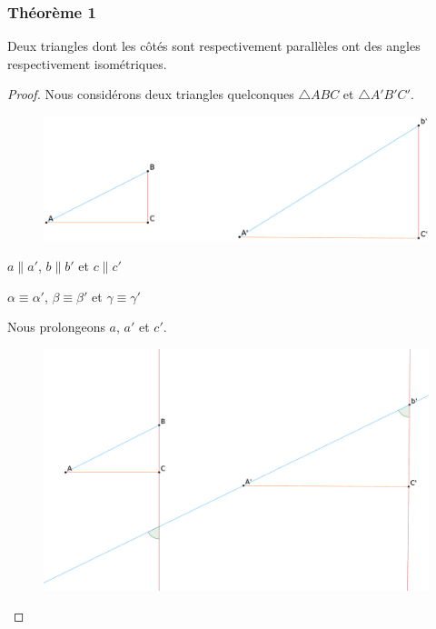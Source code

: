 \documentclass[a4paper,12pt]{article}
\begin{document}
\subsubsection{Théorème 1}
\begin{theorem}
Deux triangles dont les côtés sont respectivement parallèles ont des angles respectivement isométriques.
\end{theorem}

\begin{proof}
Nous considérons deux triangles quelconques $\triangle ABC$ et $\triangle A'B'C'$.



\begin{figure}[H]
        \centering
        \includegraphics[scale=0.17]{semblable1-1.eps}
    \end{figure}

\begin{hyp}
$a \parallel a'$, $b \parallel b'$ et $c \parallel c'$
\end{hyp}
\begin{concl}
$\alpha \equiv \alpha'$, $\beta \equiv \beta'$ et $\gamma \equiv \gamma'$
\end{concl}

Nous prolongeons $a$, $a'$ et $c'$. 

\begin{figure}[H]
        \centering
        \includegraphics[scale=0.17]{semblable1-2.eps}
    \end{figure}


\end{proof}
\end{document}
